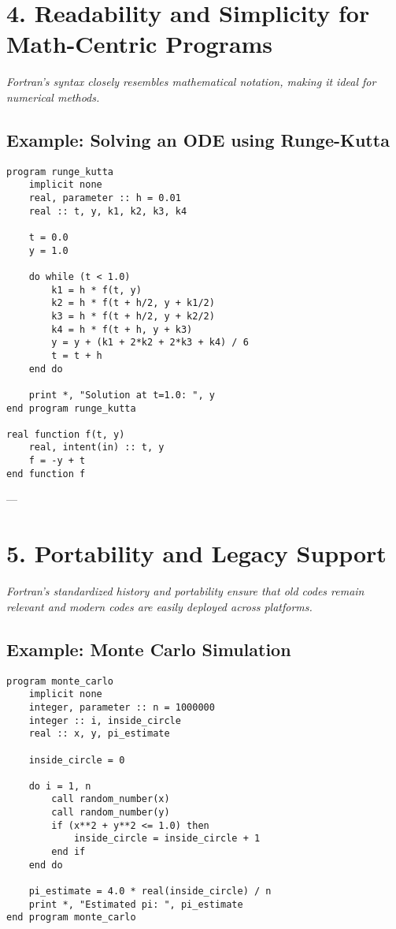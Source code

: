 \documentclass[a4paper,11pt]{article}
\begin{document}
\section{4. Readability and Simplicity for Math-Centric Programs}
\textit{Fortran’s syntax closely resembles mathematical notation, making it ideal for numerical methods.}

\subsection{Example: Solving an ODE using Runge-Kutta}
\begin{lstlisting}[caption={Runge-Kutta Method for ODEs}]
program runge_kutta
    implicit none
    real, parameter :: h = 0.01
    real :: t, y, k1, k2, k3, k4

    t = 0.0
    y = 1.0

    do while (t < 1.0)
        k1 = h * f(t, y)
        k2 = h * f(t + h/2, y + k1/2)
        k3 = h * f(t + h/2, y + k2/2)
        k4 = h * f(t + h, y + k3)
        y = y + (k1 + 2*k2 + 2*k3 + k4) / 6
        t = t + h
    end do

    print *, "Solution at t=1.0: ", y
end program runge_kutta

real function f(t, y)
    real, intent(in) :: t, y
    f = -y + t
end function f
\end{lstlisting}

---

\section{5. Portability and Legacy Support}
\textit{Fortran’s standardized history and portability ensure that old codes remain relevant and modern codes are easily deployed across platforms.}

\subsection{Example: Monte Carlo Simulation}
\begin{lstlisting}[caption={Monte Carlo Simulation for π Estimation}]
program monte_carlo
    implicit none
    integer, parameter :: n = 1000000
    integer :: i, inside_circle
    real :: x, y, pi_estimate

    inside_circle = 0

    do i = 1, n
        call random_number(x)
        call random_number(y)
        if (x**2 + y**2 <= 1.0) then
            inside_circle = inside_circle + 1
        end if
    end do

    pi_estimate = 4.0 * real(inside_circle) / n
    print *, "Estimated pi: ", pi_estimate
end program monte_carlo
\end{lstlisting}
\end{document}
